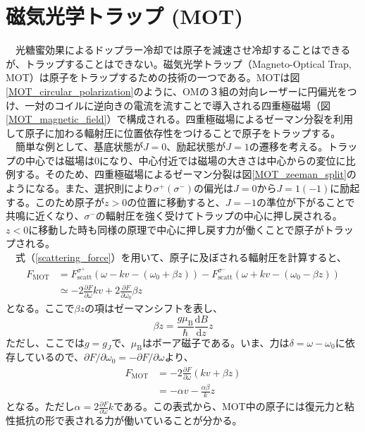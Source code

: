 \documentclass[uplatex,dvipdfmx,a4paper,report,papersize,11pt]{jsbook}
\begin{document}
\section{磁気光学トラップ (MOT)}
　光糖蜜効果によるドップラー冷却では原子を減速させ冷却することはできるが、トラップすることはできない。磁気光学トラップ（Magneto-Optical Trap, MOT）は原子をトラップするための技術の一つである。MOTは図\ref{MOT_circular_polarization}のように、OMの３組の対向レーザーに円偏光をつけ、一対のコイルに逆向きの電流を流すことで導入される四重極磁場（図\ref{MOT_magnetic_field}）で構成される。四重極磁場によるゼーマン分裂を利用して原子に加わる輻射圧に位置依存性をつけることで原子をトラップする。\\
　簡単な例として、基底状態が$J = 0$、励起状態が$J = 1$の遷移を考える。トラップの中心では磁場は$0$になり、中心付近では磁場の大きさは中心からの変位に比例する。そのため、四重極磁場によるゼーマン分裂は図\ref{MOT_zeeman_split}のようになる。また、選択則により$\sigma^{+}(\sigma^{-})$の偏光は$J = 0$から$J = 1 (-1)$に励起する。このため原子が$z > 0$の位置に移動すると、$J = -1$の準位が下がることで共鳴に近くなり、$\sigma^-$の輻射圧を強く受けてトラップの中心に押し戻される。$z < 0$に移動した時も同様の原理で中心に押し戻す力が働くことで原子がトラップされる。\\
 　式（\ref{scattering_force}）を用いて、原子に及ぼされる輻射圧を計算すると、
\begin{equation}
  \begin{aligned}
     F _ { \mathrm { MOT } } & = F _ { \mathrm { scatt } } ^ { \sigma ^ { + } } \left( \omega - k v - \left( \omega _ { 0 } + \beta z \right) \right) - F _ { \mathrm { scatt } } ^ { \sigma ^ { - } } \left( \omega + k v - \left( \omega _ { 0 } - \beta z \right) \right) \\ & \simeq - 2 \frac { \partial F } { \partial \omega } k v + 2 \frac { \partial F } { \partial \omega _ { 0 } } \beta z
  \end{aligned}
\end{equation}
となる。ここで$\beta z$の項はゼーマンシフトを表し、
\begin{equation}
  \beta z = \frac { g \mu _ { \mathrm { B } } } { \hbar } \frac { \mathrm { d } B } { \mathrm { d } z } z
\end{equation}
ただし、ここでは$g = g _ { J }$で、$\mu _ { \mathrm { B }}$はボーア磁子である。いま、力は$\delta = \omega - \omega _ { 0 }$に依存しているので、$\partial F / \partial \omega _ { 0 } = - \partial F / \partial \omega$より、
\begin{equation}
  \begin{aligned} F _ { \mathrm { MOT } } & = - 2 \frac { \partial F } { \partial \omega } ( k v + \beta z ) \\ & = - \alpha v - \frac { \alpha \beta } { k } z \end{aligned}
\end{equation}
となる。ただし$\alpha = 2\frac{\partial F}{\partial \omega} k$である。この表式から、MOT中の原子には復元力と粘性抵抗の形で表される力が働いていることが分かる。
\newpage
\end{document}
